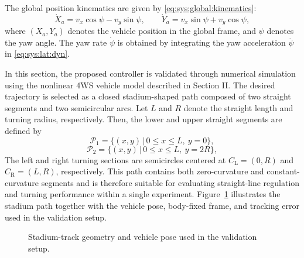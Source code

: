 \documentclass[letterpaper, journal]{IEEEtran}
\begin{document}
\hfill

The global position kinematics are given by \eqref{eq:sys:global:kinematics}:
\begin{equation} \label{eq:sys:global:kinematics}
    \dot{X}_a 
    = 
    v_x \cos\psi
    - 
    v_y \sin\psi, \qquad
    \dot{Y}_a 
    = 
    v_x \sin\psi 
    + 
    v_y \cos\psi
    ,
\end{equation}
where $(X_a,Y_a)$ denotes the vehicle position in the global frame, and $\psi$ denotes the yaw angle. The yaw rate $\dot{\psi}$ is obtained by integrating the yaw acceleration $\ddot{\psi}$ in \eqref{eq:sys:lat:dyn}.


In this section, the proposed controller is validated through numerical simulation using the nonlinear 4WS vehicle model described in Section II. The desired trajectory is selected as a closed stadium-shaped path composed of two straight segments and two semicircular arcs. Let $L$ and $R$ denote the straight length and turning radius, respectively. Then, the lower and upper straight segments are defined by
\begin{equation} \label{eq:stadium_path:upper}
    \mathcal{P}_1 
    = 
    \{(x,y)\,|\,0 \le x \le L,\ y=0\},
\end{equation}
\begin{equation} \label{eq:stadium_path:lower}
    \mathcal{P}_2
    = 
    \{(x,y)\,|\,0 \le x \le L,\ y=2R\}
    ,
\end{equation}
The left and right turning sections are semicircles centered at
$C_{\mathrm{L}}=(0,R)$ and $C_{\mathrm{R}}=(L,R)$, respectively. 
This path contains both zero-curvature and constant-curvature segments 
and is therefore suitable for evaluating straight-line regulation and turning performance within a single experiment. Figure~\ref{fig:stadium-geometry} illustrates the stadium path together with the vehicle pose, body-fixed frame, and tracking error used in the validation setup.

\begin{figure}[!t]
    \centering
    \caption{Stadium-track geometry and vehicle pose used in the validation setup.}
    \label{fig:stadium-geometry}
\end{figure}
\end{document}

